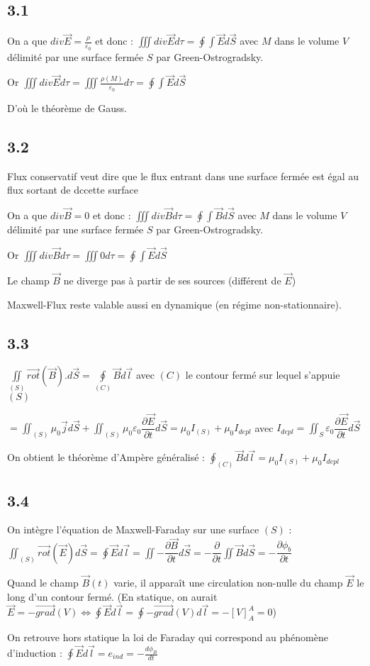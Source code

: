 \documentclass[a4paper,12pt]{book}
\begin{document}
\subsection{3.1}
On a que $div\vec{E}=\frac{\rho}{\varepsilon_0}$ et donc : $\iiint div\vec{E}d\tau=\oint\int\vec{E}d\vec{S}$ avec $M$ dans le volume $V$ délimité par une surface fermée $S$ par Green-Ostrogradsky.
\par Or $\iiint div\vec{E}d\tau=\iiint\frac{\rho(M)}{\varepsilon_0}d\tau=\oint\int\vec{E}d\vec{S}$
\par D'où le théorème de Gauss.

\subsection{3.2}
Flux conservatif veut dire que le flux entrant dans une surface fermée est égal au flux sortant de dccette surface
\par On a que $div\vec{B}=0$ et donc : $\iiint div\vec{B}d\tau=\oint\int\vec{B}d\vec{S}$ avec $M$ dans le volume $V$ délimité par une surface fermée $S$ par Green-Ostrogradsky. 
\par Or $\iiint div\vec{B}d\tau=\iiint 0d\tau=\oint\int\vec{E}d\vec{S}$
\par Le champ $\vec{B}$ ne diverge pas à partir de ses sources (différent de $\vec{E}$) 
\par Maxwell-Flux reste valable aussi en dynamique (en régime non-stationnaire).

\subsection{3.3}
$\iint\limits_{(S)}\vec{rot}(\vec{B}).d\vec{S} = \oint\limits_{(C)}\vec{B}d\vec{l}$ avec $(C)$ le contour fermé sur lequel s'appuie $(S)$
\par $=\iint_{(S)}\mu_0\vec{j}d\vec{S} + \iint_{(S)}\mu_0\varepsilon_0\dfrac{\partial \vec{E}}{\partial t}d\vec{S} = \mu_0I_{(S)} + \mu_0I_{depl}$ avec $I_{depl}=\iint_{S}\varepsilon_0\dfrac{\partial\vec{E}}{\partial t}d\vec{S}$
\par On obtient le théorème d'Ampère généralisé : $\oint_{(C)}\vec{B}d\vec{l} = \mu_0I_{(S)}+\mu_0I_{depl}$

\subsection{3.4}
On intègre l'équation de Maxwell-Faraday sur une surface $(S)$ : $\iint_{(S)}\vec{rot}(\vec{E})d\vec{S} = \oint\vec{E}d\vec{l} = \iint -\dfrac{\partial\vec{B}}{\partial t}d\vec{S} = -\dfrac{\partial}{\partial t}\iint\vec{B}d\vec{S}= -\dfrac{\partial \phi_b}{\partial t}$
\par Quand le champ $\vec{B}(t)$ varie, il apparaît une circulation non-nulle du champ $\vec{E}$ le long d'un contour fermé. (En statique, on aurait $\vec{E}=-\vec{grad}(V) \Leftrightarrow \oint\vec{E}d\vec{l}=\oint-\vec{grad}(V)d\vec{l}=-[V]_A^A=0$)
\par On retrouve hors statique la loi de Faraday qui correspond au phénomène d'induction : $\oint \vec{E}d\vec{l}=e_{ind}=-\frac{d\phi_B}{dt}$
\end{document}
